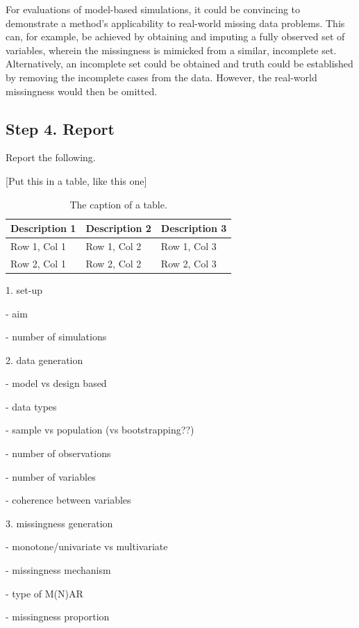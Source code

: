 \documentclass[bimj,fleqn]{w-art}
\theoremstyle{plain}
\theoremstyle{definition}
\begin{document}
For evaluations of model-based simulations, it could be convincing to demonstrate a method's applicability to real-world missing data problems. This can, for example, be achieved by obtaining and imputing a fully observed set of variables, wherein the missingness is mimicked from a similar, incomplete set. Alternatively, an incomplete set could be obtained and truth could be established by removing the incomplete cases from the data. However, the real-world missingness would then be omitted.


\subsection{Step 4. Report}

Report the following.

[Put this in a table, like this one]

\begin{table}[htb]
\begin{center}
\caption{The caption of a table.}
\begin{tabular}{lll}
\hline
Description 1 & Description 2 & Description 3\\
\hline
Row 1, Col 1 & Row 1, Col 2 & Row 1, Col 3\\
Row 2, Col 1 & Row 2, Col 2 & Row 2, Col 3\\
\hline
\end{tabular}
\end{center}
\end{table}

1. set-up

- aim

- number of simulations

2. data generation

- model vs design based

- data types

- sample vs population (vs bootstrapping??)

- number of observations

- number of variables

- coherence between variables


3. missingness generation

- monotone/univariate vs multivariate

- missingness mechanism

- type of M(N)AR

- missingness proportion 
\end{document}
